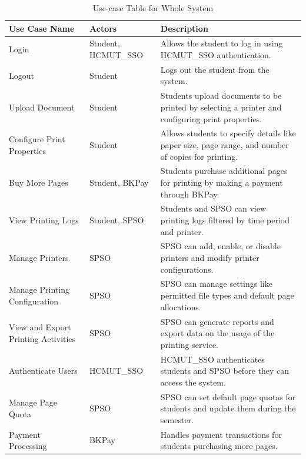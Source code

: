 \clearpage
\begin{table}[h!]
\centering
\renewcommand{\arraystretch}{1.8}
\begin{tabular}{|>{\raggedright\arraybackslash}p{3cm}|>{\centering\arraybackslash}p{3cm}|p{7cm}|}
\hline
\textbf{Use Case Name} & \textbf{Actors} & \textbf{Description} \\ \hline
Login & Student,  HCMUT\_SSO & Allows the student to log in using HCMUT\_SSO authentication. \\ \hline
Logout & Student & Logs out the student from the system. \\ \hline
Upload Document & Student & Students upload documents to be printed by selecting a printer and configuring print properties. \\ \hline
Configure Print Properties & Student & Allows students to specify details like paper size, page range, and number of copies for printing. \\ \hline
Buy More Pages & Student, BKPay & Students purchase additional pages for printing by making a payment through BKPay. \\ \hline
View Printing Logs & Student, SPSO & Students and SPSO can view printing logs filtered by time period and printer. \\ \hline
Manage Printers & SPSO & SPSO can add, enable, or disable printers and modify printer configurations. \\ \hline
Manage Printing Configuration & SPSO & SPSO can manage settings like permitted file types and default page allocations. \\ \hline
View and Export Printing Activities & SPSO & SPSO can generate reports and export data on the usage of the printing service. \\ \hline
Authenticate Users & HCMUT\_SSO & HCMUT\_SSO authenticates students and SPSO before they can access the system. \\ \hline
Manage Page Quota & SPSO & SPSO can set default page quotas for students and update them during the semester. \\ \hline
Payment Processing & BKPay & Handles payment transactions for students purchasing more pages. \\ [2ex] \hline
\end{tabular}
\caption{Use-case Table for Whole System}
\label{tab:use_case_table_whole_system}
\end{table}




